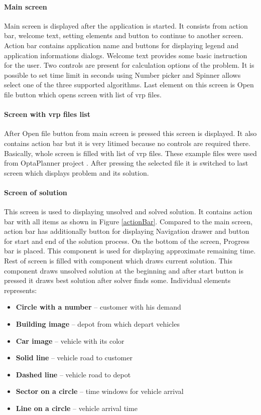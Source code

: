 \paragraph{Main screen}
Main screen is displayed after the application is started. It consists from action bar, welcome text, setting elements
and button to continue to another screen. Action bar contains application name and buttons for displaying legend and
application informations dialogs. Welcome text provides some basic instruction for the user. Two controls are present
for calculation options of the problem. It is possible to set time limit in seconds using Number picker and Spinner
allows select one of the three supported algorithms. Last element on this screen is Open file button which opens screen
with list of vrp files.

\paragraph{Screen with vrp files list} After Open file button from main screen is pressed this screen is displayed. It
also contains action bar but it is very litimed because no controls are required there. Basically, whole screen is
filled with list of vrp files. These example files were used from OptaPlanner project \cite{OptaPlannerPages}. After
pressing the selected file it is switched to last screen which displays problem and its solution.

\paragraph{Screen of solution}
This screen is used to displaying unsolved and solved solution. It contains action bar with all items as shown in Figure
\ref{actionBar}. Compared to the main screen, action bar has additionally button for displaying Navigation drawer and
button for start and end of the solution process. On the bottom of the screen, Progress bar is placed. This component
is used for displaying approximate remaining time. Rest of screen is filled with component which draws current solution.
This component draws unsolved solution at the beginning and after start button is pressed it draws best solution after
solver finds some. Individual elements represents:

\begin{itemize}
  \item \textbf{Circle with a number} -- customer with his demand
  \item \textbf{Building image} -- depot from which depart vehicles
  \item \textbf{Car image} -- vehicle with its color
  \item \textbf{Solid line} -- vehicle road to customer
  \item \textbf{Dashed line} -- vehicle road to depot
  \item \textbf{Sector on a circle} -- time windows for vehicle arrival
  \item \textbf{Line on a circle} -- vehicle arrival time
\end{itemize}


